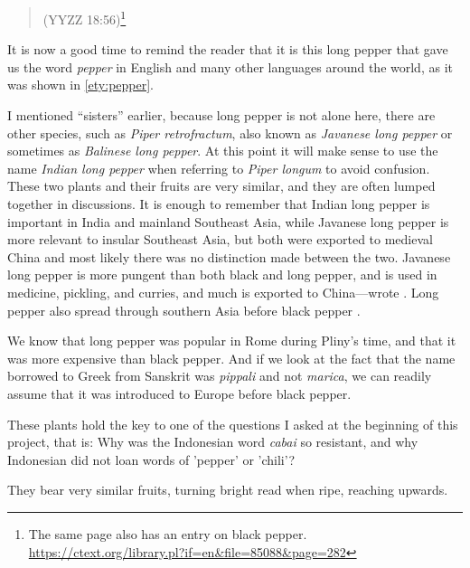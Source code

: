 \begin{quote}
     (\gls{YYZZ} 18:56)\footnote{The same page also has an entry on black pepper. \url{https://ctext.org/library.pl?if=en&file=85088&page=282}}
\end{quote}

It is now a good time to remind the reader that it is this long pepper that gave us the word \textit{pepper} in English and many other languages around the world, as it was shown in \ref{ety:pepper}. 

I mentioned ``sisters'' earlier, because long pepper is not alone here, there are other species, such as \textit{Piper retrofractum}, also known as \textit{Javanese long pepper} or sometimes as \textit{Balinese long pepper}. At this point it will make sense to use the name \textit{Indian long pepper} when referring to \textit{Piper longum} to avoid confusion. These two plants and their fruits are very similar, and they are often lumped together in discussions. It is enough to remember that Indian long pepper is important in India and mainland Southeast Asia, while Javanese long pepper is more relevant to insular Southeast Asia, but both were exported to medieval China and most likely there was no distinction made between the two. Javanese long pepper is more pungent than both black and long pepper, and is used in medicine, pickling, and curries, and much is exported to China---wrote \textcite{burkill_dictionary_1935}. Long pepper also spread through southern Asia before black pepper \autocite[1746-1751]{burkill_dictionary_1935}. 

We know that long pepper was popular in Rome during Pliny's time, and that it was more expensive than black pepper. And if we look at the fact that the name borrowed to Greek from Sanskrit was \textit{pippali} and not \textit{marica}, we can readily assume that it was introduced to Europe before black pepper.

These plants hold the key to one of the questions I asked at the beginning of this project, that is: Why was the Indonesian word \textit{cabai} so resistant, and why Indonesian did not loan words of 'pepper' or 'chili'?  

They bear very similar fruits, turning bright read when ripe, reaching upwards.  




